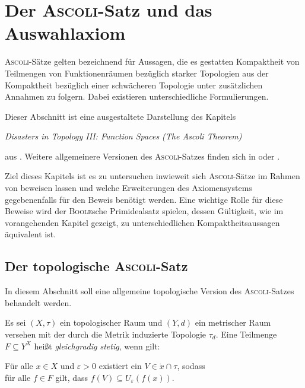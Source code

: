 \chapter{Der \textsc{Ascoli}-Satz und das Auswahlaxiom}

\textsc{Ascoli}-Sätze gelten bezeichnend für Aussagen, die es gestatten Kompaktheit von Teilmengen von Funktionenräumen bezüglich starker Topologien aus der Kompaktheit bezüglich einer schwächeren Topologie unter zusätzlichen Annahmen zu folgern. 
Dabei existieren unterschiedliche Formulierungen.

Dieser Abschnitt ist eine ausgestaltete Darstellung des Kapitels  
\begin{addmargin}[2em]{2em}%
  \textit{Disasters in Topology III: Function Spaces (The Ascoli Theorem)}
\end{addmargin}
aus \cite{herrlich2006axiom}.
Weitere allgemeinere Versionen des \textsc{Ascoli}\hyp{}Satzes finden sich in \cite{bartsch2015allgemeine} oder \cite{poppe1974compactness}.

Ziel dieses Kapitels ist es zu untersuchen inwieweit sich \textsc{Ascoli}\hyp{}Sätze im Rahmen von \ZF beweisen lassen und welche Erweiterungen des Axiomensystems \ZF gegebenenfalls für den Beweis benötigt werden.
Eine wichtige Rolle für diese Beweise wird der \textsc{Boole}sche Primidealsatz \PIT spielen, dessen Gültigkeit, wie im vorangehenden Kapitel gezeigt, zu unterschiedlichen Kompaktheitsaussagen äquivalent ist.

\section{Der topologische \textsc{Ascoli}-Satz}

In diesem Abschnitt soll eine allgemeine topologische Version des \textsc{Ascoli}\hyp{}Satzes behandelt werden.

\begin{defn}
  Es sei $(X,\tau)$ ein topologischer Raum und $(Y,d)$ ein metrischer Raum versehen mit der durch die Metrik induzierte Topologie $\tau_d$. Eine Teilmenge $F \subseteq Y^X$ heißt \textit{gleichgradig stetig}, wenn gilt:
  \begin{addmargin}[2em]{2em}%
    Für alle $x \in X$ und $\varepsilon > 0$ existiert ein $V \in \dot{x} \cap \tau$, sodass \\
    für alle $f \in F$ gilt, dass $f(V) \subseteq U_\varepsilon(f(x))$.
  \end{addmargin}
\end{defn}


